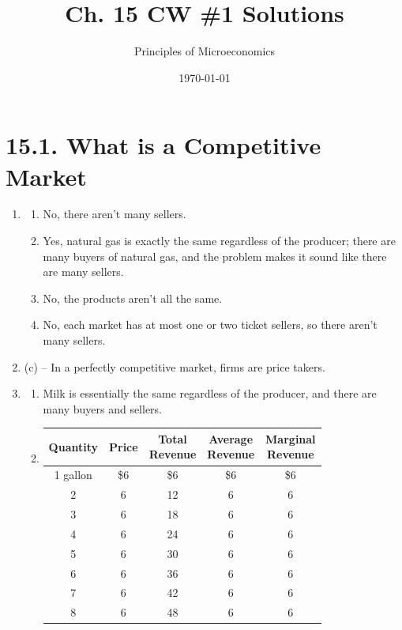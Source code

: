 \documentclass{article}
\title{Ch. 15 CW \#1 Solutions}
\author{Principles of Microeconomics}
\date{\today}
\begin{document}
\maketitle

\section*{15.1. What is a Competitive Market}

\begin{enumerate}

\item 

	\begin{enumerate}
	
	\item No, there aren't many sellers.
	
	\item Yes, natural gas is exactly the same regardless of the producer; there are many buyers of natural gas, and the problem makes it sound like there are many sellers.
	
	\item No, the products aren't all the same.
	
	\item No, each market has at most one or two ticket sellers, so there aren't many sellers.
	
	\end{enumerate}
	
\item (c) -- In a perfectly competitive market, firms are price takers.

\item

	\begin{enumerate}
	
	\item Milk is essentially the same regardless of the producer, and there are many buyers and sellers.
	
	\item
	
		\begin{center}
		\begin{tabular}{c | c | c | c | c }
		Quantity & Price & \makecell{Total\\Revenue} & \makecell{Average\\Revenue} & \makecell{Marginal\\Revenue} \\
		\hline
		1 gallon & \$6 & \$6 & \$6 & \$6 \\
		\hline
		2 & 6 & 12 & 6 & 6 \\
		\hline
		3 & 6 & 18 & 6 & 6 \\
		\hline
		4 & 6 & 24 & 6 & 6 \\
		\hline
		5 & 6 & 30 & 6 & 6 \\
		\hline
		6 & 6 & 36 & 6 & 6 \\
		\hline
		7 & 6 & 42 & 6 & 6 \\
		\hline
		8 & 6 & 48 & 6 & 6
		\end{tabular}
		\end{center}
	

\end{enumerate}
\end{enumerate}
\end{document}
